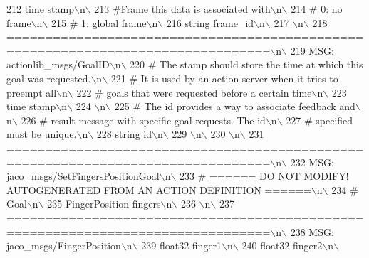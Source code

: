 \begin{DoxyCode}
212 \textcolor{stringliteral}{time stamp\(\backslash\)n\(\backslash\)}
213 \textcolor{stringliteral}{#Frame this data is associated with\(\backslash\)n\(\backslash\)}
214 \textcolor{stringliteral}{# 0: no frame\(\backslash\)n\(\backslash\)}
215 \textcolor{stringliteral}{# 1: global frame\(\backslash\)n\(\backslash\)}
216 \textcolor{stringliteral}{string frame\_id\(\backslash\)n\(\backslash\)}
217 \textcolor{stringliteral}{\(\backslash\)n\(\backslash\)}
218 \textcolor{stringliteral}{================================================================================\(\backslash\)n\(\backslash\)}
219 \textcolor{stringliteral}{MSG: actionlib\_msgs/GoalID\(\backslash\)n\(\backslash\)}
220 \textcolor{stringliteral}{# The stamp should store the time at which this goal was requested.\(\backslash\)n\(\backslash\)}
221 \textcolor{stringliteral}{# It is used by an action server when it tries to preempt all\(\backslash\)n\(\backslash\)}
222 \textcolor{stringliteral}{# goals that were requested before a certain time\(\backslash\)n\(\backslash\)}
223 \textcolor{stringliteral}{time stamp\(\backslash\)n\(\backslash\)}
224 \textcolor{stringliteral}{\(\backslash\)n\(\backslash\)}
225 \textcolor{stringliteral}{# The id provides a way to associate feedback and\(\backslash\)n\(\backslash\)}
226 \textcolor{stringliteral}{# result message with specific goal requests. The id\(\backslash\)n\(\backslash\)}
227 \textcolor{stringliteral}{# specified must be unique.\(\backslash\)n\(\backslash\)}
228 \textcolor{stringliteral}{string id\(\backslash\)n\(\backslash\)}
229 \textcolor{stringliteral}{\(\backslash\)n\(\backslash\)}
230 \textcolor{stringliteral}{\(\backslash\)n\(\backslash\)}
231 \textcolor{stringliteral}{================================================================================\(\backslash\)n\(\backslash\)}
232 \textcolor{stringliteral}{MSG: jaco\_msgs/SetFingersPositionGoal\(\backslash\)n\(\backslash\)}
233 \textcolor{stringliteral}{# ====== DO NOT MODIFY! AUTOGENERATED FROM AN ACTION DEFINITION ======\(\backslash\)n\(\backslash\)}
234 \textcolor{stringliteral}{# Goal\(\backslash\)n\(\backslash\)}
235 \textcolor{stringliteral}{FingerPosition fingers\(\backslash\)n\(\backslash\)}
236 \textcolor{stringliteral}{\(\backslash\)n\(\backslash\)}
237 \textcolor{stringliteral}{================================================================================\(\backslash\)n\(\backslash\)}
238 \textcolor{stringliteral}{MSG: jaco\_msgs/FingerPosition\(\backslash\)n\(\backslash\)}
239 \textcolor{stringliteral}{float32 finger1\(\backslash\)n\(\backslash\)}
240 \textcolor{stringliteral}{float32 finger2\(\backslash\)n\(\backslash\)}

\end{DoxyCode}
